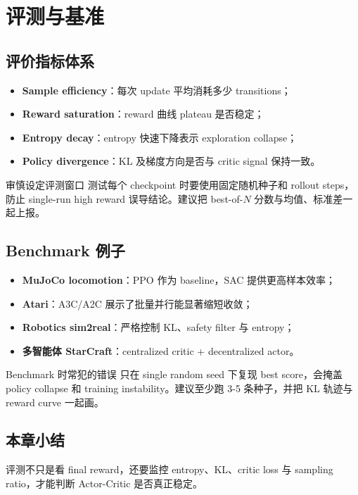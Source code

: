 \section{评测与基准}

\subsection{评价指标体系}

\begin{itemize}
    \item \textbf{Sample efficiency}：每次 update 平均消耗多少 transitions；
    \item \textbf{Reward saturation}：reward 曲线 plateau 是否稳定；
    \item \textbf{Entropy decay}：entropy 快速下降表示 exploration collapse；
    \item \textbf{Policy divergence}：KL 及梯度方向是否与 critic signal 保持一致。
\end{itemize}

\begin{importantbox}{审慎设定评测窗口}
测试每个 checkpoint 时要使用固定随机种子和 rollout steps，防止 single-run high reward 误导结论。建议把 best-of-$N$ 分数与均值、标准差一起上报。
\end{importantbox}

\subsection{Benchmark 例子}

\begin{itemize}
    \item \textbf{MuJoCo locomotion}：PPO 作为 baseline，SAC 提供更高样本效率；
    \item \textbf{Atari}：A3C/A2C 展示了批量并行能显著缩短收敛；
    \item \textbf{Robotics sim2real}：严格控制 KL、safety filter 与 entropy；
    \item \textbf{多智能体 StarCraft}：centralized critic + decentralized actor。
\end{itemize}

\begin{knowledgebox}{Benchmark 时常犯的错误}
只在 single random seed 下复现 best score，会掩盖 policy collapse 和 training instability。建议至少跑 3-5 条种子，并把 KL 轨迹与 reward curve 一起画。
\end{knowledgebox}

\subsection{本章小结}

评测不只是看 final reward，还要监控 entropy、KL、critic loss 与 sampling ratio，才能判断 Actor-Critic 是否真正稳定。

